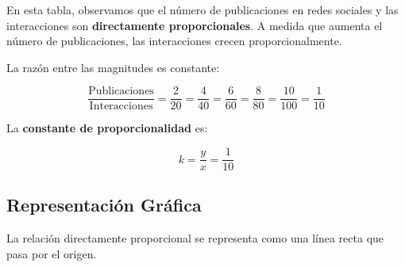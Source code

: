 \documentclass[
  stu,
  floatsintext,
  longtable,
  a4paper,
  nolmodern,
  notxfonts,
  notimes,
  12pt,
  colorlinks=true,linkcolor=blue,citecolor=blue,urlcolor=blue]{apa7}
\begin{document}
En esta tabla, observamos que el número de publicaciones en redes
sociales y las interacciones son \textbf{directamente proporcionales}. A
medida que aumenta el número de publicaciones, las interacciones crecen
proporcionalmente.

La razón entre las magnitudes es constante:

\[
\frac{\text{Publicaciones}}{\text{Interacciones}} = \frac{2}{20} = \frac{4}{40} = \frac{6}{60} = \frac{8}{80} = \frac{10}{100} = \frac{1}{10}
\]

La \textbf{constante de proporcionalidad} es:

\[
k = \frac{y}{x} = \frac{1}{10}
\]

\subsection{Representación Gráfica}\label{representaciuxf3n-gruxe1fica}

La relación directamente proporcional se representa como una línea recta
que pasa por el origen.
\end{document}
